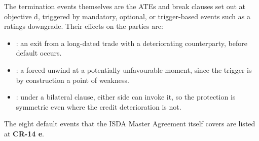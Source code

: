 
The termination events themselves are the ATEs and break clauses set out at
objective d, triggered by mandatory, optional, or trigger-based events such as a
ratings downgrade. Their effects on the parties are:

\begin{itemize}
\item {}: an exit from a long-dated trade with a
deteriorating counterparty, before default occurs.
\item {}: a forced unwind at a potentially unfavourable
moment, since the trigger is by construction a point of weakness.
\item {}: under a bilateral clause, either side can invoke it, so the
protection is symmetric even where the credit deterioration is not.
\end{itemize}

The eight default events that the ISDA Master Agreement itself covers are listed
at \textbf{CR-14 e}.
